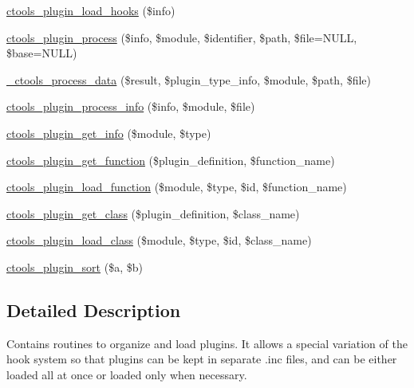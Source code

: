 \begin{DoxyCompactItemize}
\item 
\hyperlink{ctools_2includes_2plugins_8inc_a4f9d205d17ac047d08346c891254b57d}{ctools\_\-plugin\_\-load\_\-hooks} (\$info)
\item 
\hyperlink{ctools_2includes_2plugins_8inc_aff587a2748bb8d3878f2d2a4f9250b32}{ctools\_\-plugin\_\-process} (\$info, \$module, \$identifier, \$path, \$file=NULL, \$base=NULL)
\item 
\hyperlink{ctools_2includes_2plugins_8inc_a634693920c81e6d69da96fe997af17d1}{\_\-ctools\_\-process\_\-data} (\$result, \$plugin\_\-type\_\-info, \$module, \$path, \$file)
\item 
\hyperlink{ctools_2includes_2plugins_8inc_a2f5e8eee53eebcb762bcbc5f30bc7b87}{ctools\_\-plugin\_\-process\_\-info} (\$info, \$module, \$file)
\item 
\hyperlink{ctools_2includes_2plugins_8inc_addf3f6a3107a10cf5fb701420a9f8dcb}{ctools\_\-plugin\_\-get\_\-info} (\$module, \$type)
\item 
\hyperlink{ctools_2includes_2plugins_8inc_a5d95e845938d9bd5f3868de95799c0b0}{ctools\_\-plugin\_\-get\_\-function} (\$plugin\_\-definition, \$function\_\-name)
\item 
\hyperlink{ctools_2includes_2plugins_8inc_aebe9811456caa97876b9b7bc12910fef}{ctools\_\-plugin\_\-load\_\-function} (\$module, \$type, \$id, \$function\_\-name)
\item 
\hyperlink{ctools_2includes_2plugins_8inc_a79a44a3c01ce410ebae10639f3b4436a}{ctools\_\-plugin\_\-get\_\-class} (\$plugin\_\-definition, \$class\_\-name)
\item 
\hyperlink{ctools_2includes_2plugins_8inc_a4ad26242dff8fde79ed85d331fcf1198}{ctools\_\-plugin\_\-load\_\-class} (\$module, \$type, \$id, \$class\_\-name)
\item 
\hyperlink{ctools_2includes_2plugins_8inc_a02dbd74afeac1df5f1a6533555137a18}{ctools\_\-plugin\_\-sort} (\$a, \$b)
\end{DoxyCompactItemize}


\subsection{Detailed Description}
Contains routines to organize and load plugins. It allows a special variation of the hook system so that plugins can be kept in separate .inc files, and can be either loaded all at once or loaded only when necessary. 

